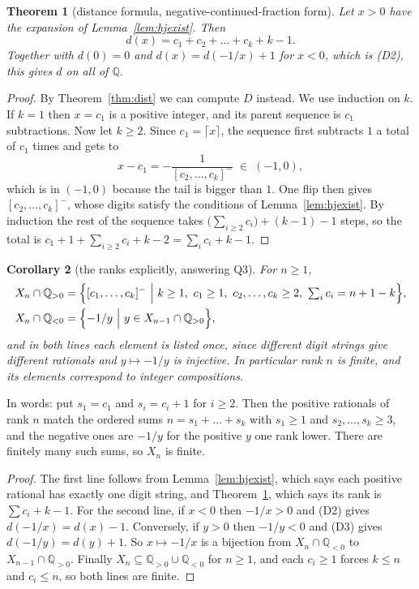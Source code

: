 \documentclass[11pt]{article}
\newtheorem{theorem}{Theorem}[section]
\newtheorem{corollary}[theorem]{Corollary}
\theoremstyle{definition}
\theoremstyle{remark}
\newcommand{\Q}{\mathbb{Q}}
\newcommand{\Qpos}{\Q_{>0}}
\newcommand{\Qneg}{\Q_{<0}}
\newcommand{\hj}[1]{[#1]^{-}}                 %
\begin{document}
\begin{theorem}[distance formula, negative-continued-fraction form]\label{thm:hj}
Let $x>0$ have the expansion of Lemma~\ref{lem:hjexist}. Then
\[
d(x)=c_1+c_2+\dots+c_k+k-1 .
\]
Together with $d(0)=0$ and $d(x)=d(-1/x)+1$ for $x<0$, which is (D2), this gives $d$ on all of $\Q$.
\end{theorem}

\begin{proof}
By Theorem~\ref{thm:dist} we can compute $D$ instead. We use induction on $k$. If $k=1$ then
$x=c_1$ is a positive integer, and its parent sequence is $c_1$ subtractions. Now let $k\ge2$. Since
$c_1=\lceil x\rceil$, the sequence first subtracts $1$ a total of $c_1$ times and gets to
\[
x-c_1=-\frac{1}{\hj{c_2,\dots,c_k}}\;\in\;(-1,0),
\]
which is in $(-1,0)$ because the tail is bigger than $1$. One flip then gives $\hj{c_2,\dots,c_k}$,
whose digits satisfy the conditions of Lemma~\ref{lem:hjexist}. By induction the rest of the
sequence takes $\bigl(\sum_{i\ge2}c_i\bigr)+(k-1)-1$ steps, so the total is
$c_1+1+\sum_{i\ge2}c_i+k-2=\sum_i c_i+k-1$.
\end{proof}

\begin{corollary}[the ranks explicitly, answering Q3]\label{cor:enum}
For $n\ge1$,
\begin{align*}
X_n\cap\Qpos &= \Bigl\{\hj{c_1,\dots,c_k}\ \Big|\ k\ge1,\ c_1\ge1,\ c_2,\dots,c_k\ge2,\
\textstyle\sum_i c_i=n+1-k\Bigr\},\\
X_n\cap\Qneg &= \Bigl\{-1/y\ \Big|\ y\in X_{n-1}\cap\Qpos\Bigr\},
\end{align*}
and in both lines each element is listed once, since different digit strings give different
rationals and $y\mapsto-1/y$ is injective. In particular rank $n$ is finite, and its elements
correspond to integer compositions.
\end{corollary}

In words: put $s_1=c_1$ and $s_i=c_i+1$ for $i\ge2$. Then the positive rationals of rank $n$ match
the ordered sums $n=s_1+\dots+s_k$ with $s_1\ge1$ and $s_2,\dots,s_k\ge3$, and the negative ones are
$-1/y$ for the positive $y$ one rank lower. There are finitely many such sums, so $X_n$ is finite.

\begin{proof}
The first line follows from Lemma~\ref{lem:hjexist}, which says each positive rational has exactly
one digit string, and Theorem~\ref{thm:hj}, which says its rank is $\sum c_i+k-1$. For the second
line, if $x<0$ then $-1/x>0$ and (D2) gives $d(-1/x)=d(x)-1$. Conversely, if $y>0$ then $-1/y<0$
and (D3) gives $d(-1/y)=d(y)+1$. So $x\mapsto-1/x$ is a bijection from $X_n\cap\Qneg$ to
$X_{n-1}\cap\Qpos$. Finally $X_n\subseteq\Qpos\cup\Qneg$ for $n\ge1$, and each $c_i\ge1$ forces
$k\le n$ and $c_i\le n$, so both lines are finite.
\end{proof}
\end{document}
